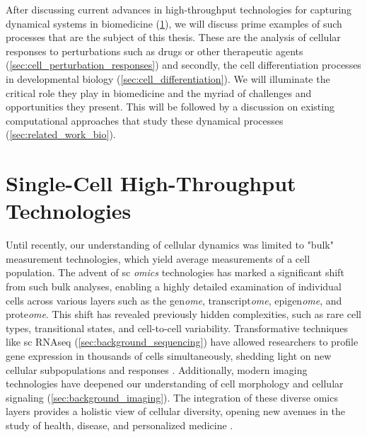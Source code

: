 After discussing current advances in high-throughput technologies for capturing dynamical systems in biomedicine (\cref{sec:tech_background}), we will discuss prime examples of such processes that are the subject of this thesis. 
These are the analysis of cellular responses to perturbations such as drugs or other therapeutic agents (\cref{sec:cell_perturbation_responses}) and secondly, the cell differentiation processes in developmental biology (\cref{sec:cell_differentiation}). We will illuminate the critical role they play in biomedicine and the myriad of challenges and opportunities they present. 
This will be followed by a discussion on existing computational approaches that study these dynamical processes (\cref{sec:related_work_bio}).


\section{Single-Cell High-Throughput Technologies}
\label{sec:tech_background}

Until recently, our understanding of cellular dynamics was limited to "bulk" measurement technologies, which yield average measurements of a cell population.
The advent of \acrfull{sc} \textit{omics} technologies has marked a significant shift from such bulk analyses, enabling a highly detailed examination of individual cells across various layers such as the gen\textit{ome}, transcript\textit{ome}, epigen\textit{ome}, and prote\textit{ome}.
This shift has revealed previously hidden complexities, such as rare cell types, transitional states, and cell-to-cell variability. Transformative techniques like \acrlong{sc} \acrfull{RNAseq} (\cref{sec:background_sequencing}) have allowed researchers to profile gene expression in thousands of cells simultaneously, shedding light on new cellular subpopulations and responses \citep{jia2022high}.
Additionally, modern imaging technologies have deepened our understanding of cell morphology and cellular signaling (\cref{sec:background_imaging}). 
The integration of these diverse omics layers provides a holistic view of cellular diversity, opening new avenues in the study of health, disease, and personalized medicine \citep{baysoy2023technological}.

